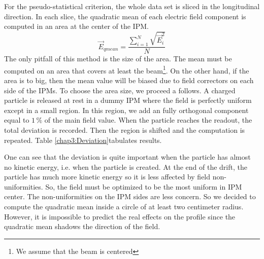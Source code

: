 \begin{refsection}
  For the pseudo-statistical criterion, the whole data set is sliced in the longitudinal direction. In each slice, the quadratic mean of each electric field component is computed in an area at the center of the IPM.
  \begin{equation}
    \vec{E}_{qmean} = \frac{\sum_{i=1}^{N}\sqrt{\vec{E}_{i}^{2}}}{N}
  \end{equation}
  The only pitfall of this method is the size of the area. The mean must be computed on an area that covers at least the beam\footnote{We assume that the beam is centered}. On the other hand, if the area is to big, then the mean value will be biased due to field correctors on each side of the IPMs.
  To choose the area size, we proceed a follows. A charged particle is released at rest in a dummy IPM where the field is perfectly uniform except in a small region. In this region, we add an fully orthogonal component equal to $1\,\mathrm{\%}$ of the main field value. When the particle reaches the readout, the total deviation is recorded. Then the region is shifted and the computation is repeated. Table \ref{chap3:Deviation}tabulates results.

  

  One can see that the deviation is quite important when the particle has almost no kinetic energy, i.e. when the particle is created.
  At the end of the drift, the particle has much more kinetic energy so it is less affected by field non-uniformities. So, the field must be optimized to be the most uniform in IPM center. The non-uniformities on the IPM sides are less concern.
  So we decided to compute the quadratic mean inside a circle of at least two centimeter radius. However, it is impossible to predict the real effects on the profile since the quadratic mean shadows the direction of the field.


\end{refsection}
